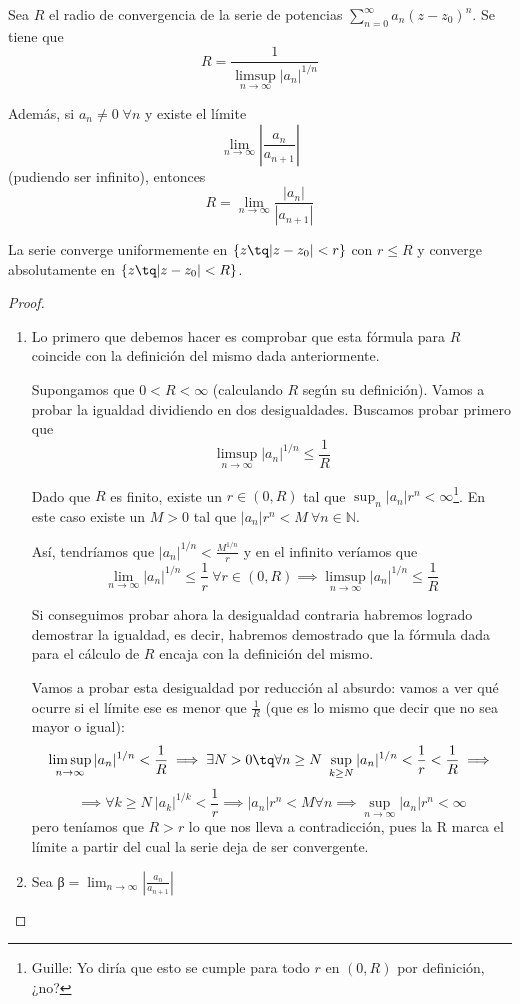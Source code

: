 \documentclass{apuntes}
\begin{document}
\begin{theorem}
Sea $R$ el radio de convergencia de la serie de potencias $\sum_{n=0}^{\infty} a_n (z-z_0)^n$. Se tiene que \[R = \frac{1}{\limsup_{n \to \infty} |a_n|^{1/n}}\]

Además, si $a_n \neq 0\; \forall n$ y existe el límite \[ \lim_{n \to \infty} \left|\frac{a_n}{a_{n+1}}\right|\] (pudiendo ser infinito), entonces \[ R = \lim_{n \to \infty}\frac{|a_n|}{|a_{n+1}|}\]

La serie converge uniformemente en $\{z \tq |z-z_0| < r\}$ con $r \leq R$ y converge absolutamente en $\{z \tq |z-z_0|<R\}$.
\end{theorem}
\begin{proof}

\begin{enumerate}
\item Lo primero que debemos hacer es comprobar que esta fórmula para $R$ coincide con la definición del mismo dada anteriormente.

Supongamos que $0<R<\infty$ (calculando $R$ según su definición). Vamos a probar la igualdad dividiendo en dos desigualdades. Buscamos probar primero que
\[\limsup_{n \to \infty} |a_n|^{1/n} \leq \frac{1}{R}\]

Dado que $R$ es finito, existe un $r∈(0,R)$ tal que $\sup_n |a_n| r^n <\infty$\footnote{Guille: Yo diría que esto se cumple para todo $r$ en $(0,R)$ por definición, ¿no?}. En este caso existe un $M>0$ tal que $|a_n|r^n < M \ \forall n ∈ ℕ$.

Así, tendríamos que $|a_n|^{1/n} < \frac{M^{1/n}}{r}$ y en el infinito veríamos que
\[\lim_{n \to \infty} |a_n|^{1/n} \leq \frac{1}{r} \ \forall r ∈ (0,R) \implies \limsup_{n \to \infty}|a_n|^{1/n} \leq \frac{1}{R}\]

Si conseguimos probar ahora la desigualdad contraria habremos logrado demostrar la igualdad, es decir, habremos demostrado que la fórmula dada para el cálculo de $R$ encaja con la definición del mismo.

Vamos a probar esta desigualdad por reducción al absurdo: vamos a ver qué ocurre si el límite ese es menor que $\frac{1}{R}$ (que es lo mismo que decir que no sea mayor o igual):
\[\limsup_{n \to \infty}|a_n|^{1/n} < \frac{1}{R} \implies \exists N > 0 \tq \forall n \geq N \ \sup_{k \geq N} |a_n|^{1/n} < \frac{1}{r} < \frac{1}{R} \implies\]
\[\implies \forall k \geq N \ |a_k|^{1/k} < \frac{1}{r} \implies |a_n| r^n < M \forall n \implies \sup_{n\to\infty}|a_n|r^n< \infty\]
pero teníamos que $R > r$ lo que nos lleva a contradicción, pues la R marca el límite a partir del cual la serie deja de ser convergente.
\item
Sea β$= \lim_{n \to \infty}\left|\frac{a_n}{a_{n+1}} \right|$


\end{enumerate}
\end{proof}
\end{document}
